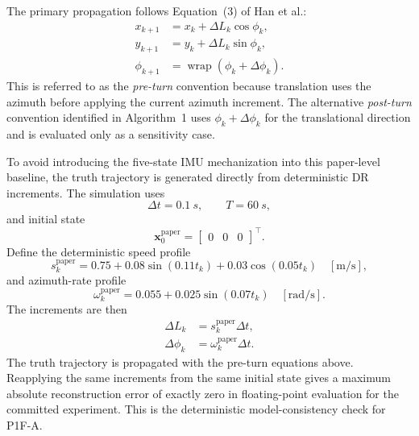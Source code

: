 The primary propagation follows Equation~(3) of Han et al.:
\begin{align}
    x_{k+1} &= x_k+\Delta L_k\cos\phi_k,\\
    y_{k+1} &= y_k+\Delta L_k\sin\phi_k,\\
    \phi_{k+1} &= \operatorname{wrap}(\phi_k+\Delta\phi_k).
\end{align}
This is referred to as the \emph{pre-turn} convention because translation uses the azimuth before applying the current azimuth increment. The alternative \emph{post-turn} convention identified in Algorithm~1 uses $\phi_k+\Delta\phi_k$ for the translational direction and is evaluated only as a sensitivity case.

To avoid introducing the five-state IMU mechanization into this paper-level baseline, the truth trajectory is generated directly from deterministic DR increments. The simulation uses
\begin{equation}
    \Delta t=\SI{0.1}{s},\qquad T=\SI{60}{s},
\end{equation}
and initial state
\begin{equation}
    \bm x_0^{\mathrm{paper}}=
    \begin{bmatrix}0&0&0\end{bmatrix}^{\top}.
\end{equation}
Define the deterministic speed profile
\begin{equation}
    s_k^{\mathrm{paper}}
    =0.75+0.08\sin(0.11t_k)+0.03\cos(0.05t_k)
    \quad [\mathrm{m/s}],
\end{equation}
and azimuth-rate profile
\begin{equation}
    \omega_k^{\mathrm{paper}}
    =0.055+0.025\sin(0.07t_k)
    \quad [\mathrm{rad/s}].
\end{equation}
The increments are then
\begin{align}
    \Delta L_k &= s_k^{\mathrm{paper}}\Delta t,\\
    \Delta\phi_k &= \omega_k^{\mathrm{paper}}\Delta t.
\end{align}
The truth trajectory is propagated with the pre-turn equations above. Reapplying the same increments from the same initial state gives a maximum absolute reconstruction error of exactly zero in floating-point evaluation for the committed experiment. This is the deterministic model-consistency check for P1F-A.

